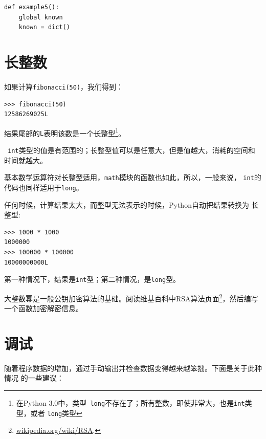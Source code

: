 \beforeverb
\begin{verbatim}
def example5():
    global known
    known = dict()
\end{verbatim}
\afterverb
%

\section{长整数}


如果计算{\tt fibonacci(50)}，我们得到：
\beforeverb
\begin{verbatim}
>>> fibonacci(50)
12586269025L
\end{verbatim}
\afterverb
%

结果尾部的{\tt L}表明该数是一个长整型\footnote{在Python 3.0中，类型{\tt
	long}不存在了；所有整数，即使非常大，也是{\tt int}类型，或者
{\tt long}类型}。


{\tt
	int}类型的值是有范围的；长整型值可以是任意大，但是值越大，消耗的空间和时间就越大。

基本数学运算符对长整型适用，{\tt math}模块的函数也如此，所以，一般来说，
{\tt int}的代码也同样适用于{\tt long}。

任何时候，计算结果太大，而整型无法表示的时候，Python自动把结果转换为
长整型:

\beforeverb
\begin{verbatim}
>>> 1000 * 1000
1000000
>>> 100000 * 100000
10000000000L
\end{verbatim}
\afterverb

第一种情况下，结果是{\tt int}型；第二种情况，是{\tt long}型。

\begin{ex}


大整数幂是一般公钥加密算法的基础。阅读维基百科中RSA算法页面\footnote{
	\url{wikipedia.org/wiki/RSA}.}，然后编写一个函数加密解密信息。
\end{ex}

\section{调试}

随着程序数据的增加，通过手动输出并检查数据变得越来越笨拙。下面是关于此种情况
的一些建议：

